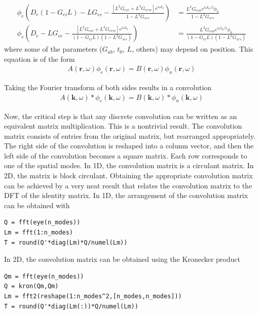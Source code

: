 \documentclass[10pt,a4paper]{article}
\begin{document}
\begin{align}
\phi_e \left(D_{e}(1-G_{ei}L) - LG_{ee} - \frac{\left[ L^2G_{ese}  + L^3 G_{erse}\right]e^{i\omega t_0}}{1 - L^2 G_{srs}} \right) &=  \frac{L^2G_{esn}e^{i\omega t_0 /2}\phi_n}{1 - L^2 G_{srs}}\\
\label{spec_spatial}
\phi_e \left(D_{e} - LG_{ee} - \frac{\left[ L^2G_{ese}  + L^3 G_{erse}\right]e^{i\omega t_0}}{(1-G_{ei}L)(1 - L^2 G_{srs})} \right) &=  \frac{L^2G_{esn}e^{i\omega t_0 /2}\phi_n}{(1-G_{ei}L)(1 - L^2 G_{srs})}
\end{align}
where some of the parameters ($G_{ab}$, $t_0$, $L$, others) may depend on position. This equation is of the form
\begin{align}
A(\mathbf{r},\omega) \phi_e(\mathbf{r},\omega) = B(\mathbf{r},\omega) \phi_n(\mathbf{r},\omega)
\end{align}

Taking the Fourier transform of both sides results in a convolution
\begin{align}
A(\mathbf{k},\omega) \ast \phi_e(\mathbf{k},\omega) = B(\mathbf{k},\omega) \ast \phi_n(\mathbf{k},\omega)
\end{align}

Now, the critical step is that any discrete convolution can be written as an equivalent matrix multiplication. This is a nontrivial result. The convolution matrix consists of entries from the original matrix, but rearranged appropriately. The right side of the convolution is reshaped into a column vector, and then the left side of the convolution becomes a square matrix. Each row corresponds to one of the spatial modes. In 1D, the convolution matrix is a circulant matrix. In 2D, the matrix is block circulant. Obtaining the appropriate convolution matrix can be achieved by a very neat result that relates the convolution matrix to the DFT of the identity matrix. In 1D, the arrangement of the convolution matrix can be obtained with

\begin{lstlisting}[style=Matlab-editor,basicstyle=\mlttfamily]
Q = fft(eye(n_modes))
Lm = fft(1:n_modes)
T = round(Q'*diag(Lm)*Q/numel(Lm))
\end{lstlisting}

In 2D, the convolution matrix can be obtained using the Kronecker product
\begin{lstlisting}[style=Matlab-editor,basicstyle=\mlttfamily]
Qm = fft(eye(n_modes))
Q = kron(Qm,Qm)
Lm = fft2(reshape(1:n_modes^2,[n_modes,n_modes]))
T = round(Q'*diag(Lm(:))*Q/numel(Lm))
\end{lstlisting}
\end{document}
